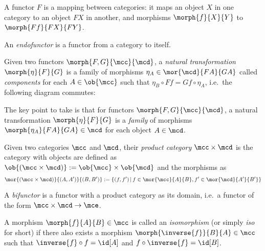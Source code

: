 A functor \(F\) is a mapping between categories: it maps an object \(X\) in one
category to an object \(FX\) in another, and morphisms \(\morph{f}{X}{Y}\) to
\(\morph{Ff}{FX}{FY}\).

\begin{definition}[Endofunctor]
    An \emph{endofunctor} is a functor from a category to itself.
\end{definition}

\begin{definition}
    Given two functors \(\morph{F, G}{\mcc}{\mcd}\), a
    \emph{natural transformation} \(\morph{\eta}{F}{G}\) is a family of
    morphisms \(
        \eta_A \in \mor{\mcd}{FA}{GA}
    \) called \emph{components} for each \(A \in \ob{\mcc}\) such that \(
        \eta_B \circ Ff = Gf \circ \eta_A
    \), i.e.\ the following diagram commutes:
    \begin{center}
        
    \end{center}
\end{definition}

The key point to take is that for functors \(\morph{F,G}{\mcc}{\mcd}\), a
natural transformation \(\morph{\eta}{F}{G}\) is a \emph{family} of morphisms
\(\morph{\eta_A}{FA}{GA} \in \mcd\) for each object \(A \in \mcd\).



\begin{definition}
    Given two categories \(\mcc\) and \(\mcd\), their \emph{product category}
    \(\mcc \times \mcd\) is the category with objects are defined as \(
        \ob{(\mcc \times \mcd)} := \ob{\mcc} \times \ob{\mcd}
    \) and the morphisms as \[
        \mor{(\mcc \times \mcd)}{(A, A^\prime)}{(B, B^\prime)}
        :=
        \{
            (f, f^\prime)
            \,|\,
            f \in \mor{\mcc}{A}{B},
            f^\prime \in \mor{\mcd}{A^\prime}{B^\prime}
        \}
    \]
\end{definition}

\begin{definition}[Bifunctor]
    A \emph{bifunctor} is a functor with a product category as its domain, i.e.\
    a functor of the form \(\mcc \times \mcd \to \mce\).
\end{definition}

\begin{definition}[Isomorphism]
    A morphism \(\morph{f}{A}{B} \in \mcc\) is called an \emph{isomorphism} (or
    simply \emph{iso} for short) if there also exists a morphism \(
        \morph{\inverse{f}}{B}{A} \in \mcc
    \) such that \(
        \inverse{f} \circ f = \id[A]
    \) and \(
        f \circ \inverse{f} = \id[B]
    \).
\end{definition}

